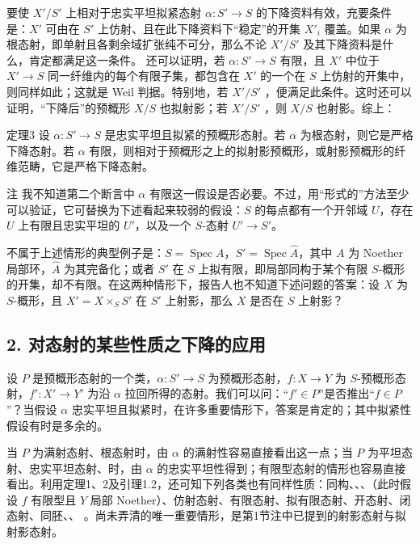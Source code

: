 要使 $X'/S'$ 上相对于忠实平坦拟紧态射 $\alpha:S'\to S$ 的下降资料有效，充要条件是：$X'$ 可由在 $S'$ 上仿射、且在此下降资料下“稳定”的开集 $X'_i$ 覆盖。如果 $\alpha$ 为根态射，即单射且各剩余域扩张纯不可分，那么不论 $X'/S'$ 及其下降资料是什么，肯定都满足这一条件。
还可以证明，若 $\alpha:S'\to S$ 有限，且 $X'$ 中位于 $X'\to S$ 同一纤维内的每个有限子集，都包含在 $X'$ 的一个在 $S$ 上仿射的开集中，则同样如此；这就是 Weil 判据。特别地，若 $X'/S'$ ，便满足此条件。这时还可以证明，“下降后”的预概形 $X/S$ 也拟射影；若 $X'/S'$ ，则 $X/S$ 也射影。综上：
\begin{statement}{定理3}
设 $\alpha:S'\to S$ 是忠实平坦且拟紧的预概形态射。若 $\alpha$ 为根态射，则它是严格下降态射。若 $\alpha$ 有限，则相对于预概形之上的拟射影预概形，或射影预概形的纤维范畴，它是严格下降态射。
\end{statement}
\begin{statement}{注}
我不知道第二个断言中 $\alpha$ 有限这一假设是否必要。不过，用“形式的”方法至少可以验证，它可替换为下述看起来较弱的假设：$S$ 的每点都有一个开邻域 $U$，存在 $U$ 上有限且忠实平坦的 $U'$，以及一个 $S$-态射 $U'\to S'$。

不属于上述情形的典型例子是：$S=\operatorname{Spec}A$，$S'=\operatorname{Spec}\widehat A$，其中 $A$ 为 Noether 局部环，$\widehat A$ 为其完备化；或者 $S'$ 在 $S$ 上拟有限，即局部同构于某个有限 $S$-概形的开集，却不有限。在这两种情形下，报告人也不知道下述问题的答案：设 $X$ 为 $S$-概形，且 $X'=X\times_SS'$ 在 $S'$ 上射影，那么 $X$ 是否在 $S$ 上射影？
\end{statement}

\subsection*{2. 对态射的某些性质之下降的应用}
设 $P$ 是预概形态射的一个类，$\alpha:S'\to S$ 为预概形态射，$f:X\to Y$ 为 $S$-预概形态射，$f':X'\to Y'$ 为沿 $\alpha$ 拉回所得的态射。我们可以问：“$f'\in P$”是否推出“$f\in P$”？当假设 $\alpha$ 忠实平坦且拟紧时，在许多重要情形下，答案是肯定的；其中拟紧性假设有时是多余的。

当 $P$ 为满射态射、根态射时，由 $\alpha$ 的满射性容易直接看出这一点；当 $P$ 为平坦态射、忠实平坦态射、时，由 $\alpha$ 的忠实平坦性得到；有限型态射的情形也容易直接看出。利用定理1、2及引理1.2，还可知下列各类也有同样性质：同构、、、（此时假设 $f$ 有限型且 $Y$ 局部 Noether）、仿射态射、有限态射、拟有限态射、开态射、闭态射、同胚、、
。尚未弄清的唯一重要情形，是第1节注中已提到的射影态射与拟射影态射。

